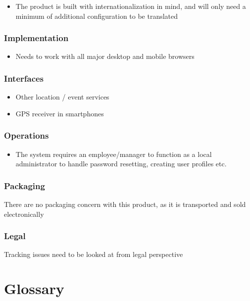 \documentclass[10pt]{article}
\begin{document}
\begin{itemize}
\item The product is built with internationalization in mind, and will only need a minimum of additional configuration to be translated
\end{itemize}


\section{Implementation}
\begin{itemize}
\item Needs to work with all major desktop and mobile browsers
\end{itemize}

\section{Interfaces}

\begin{itemize}
\item Other location / event services
\item GPS receiver in smartphones
\end{itemize}

\section{Operations}
\begin{itemize}
\item The system requires an employee/manager to function as a local administrator to handle password resetting, creating user profiles etc.
\end{itemize}

\section{Packaging}
There are no packaging concern with this product, as it is transported and sold electronically

\section{Legal}
Tracking issues need to be looked at from legal perspective


\part{Glossary}
\end{document}
